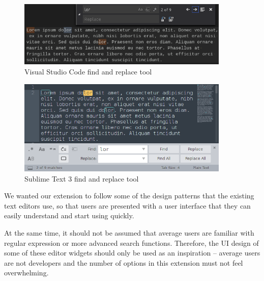 \documentclass[bsc,frontabs,twoside,singlespacing,parskip,deptreport]{infthesis}
\begin{document}
\begin{figure}[hp]
\centering
\includegraphics[width=0.9\textwidth]{../docs/editor-find-and-replace/vscode-find-and-replace.png}
\caption{Visual Studio Code find and replace tool}
\end{figure}

\begin{figure}[hp]
\centering
\includegraphics[width=0.9\textwidth]{../docs/editor-find-and-replace/sublime-find-and-replace.png}
\caption{Sublime Text 3 find and replace tool}
\end{figure}

We wanted our extension to follow some of the design patterns that the existing text editors use, so that users are presented with a user interface that they can easily understand and start using quickly.

At the same time, it should not be assumed that average users are familiar with regular expression or more advanced search functions. Therefore, the UI design of some of these editor widgets should only be used as an inspiration -- average users are not developers and the number of options in this extension must not feel overwhelming.
\end{document}
